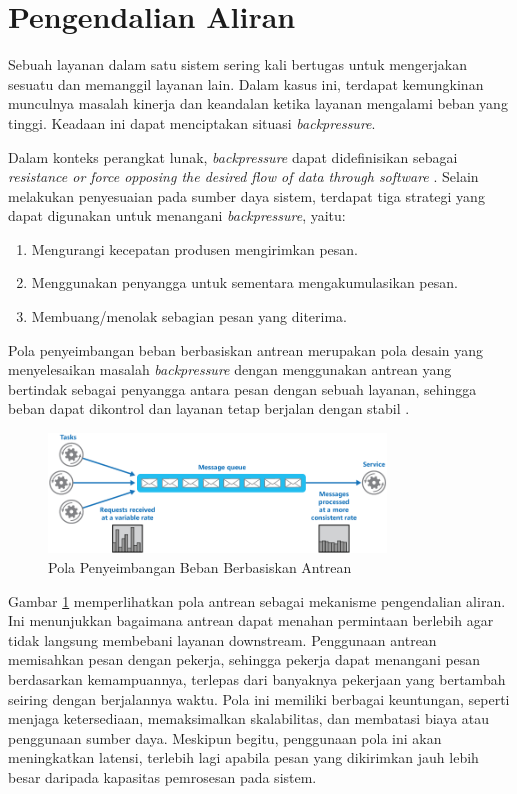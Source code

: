 \section{Pengendalian Aliran}

Sebuah layanan dalam satu sistem sering kali bertugas untuk mengerjakan sesuatu dan memanggil layanan lain. Dalam kasus ini, terdapat kemungkinan munculnya masalah kinerja dan keandalan ketika layanan mengalami beban yang tinggi. Keadaan ini dapat menciptakan situasi \textit{backpressure}.

Dalam konteks perangkat lunak, \textit{backpressure} dapat didefinisikan sebagai \textit{resistance or force opposing the desired flow of data through software} \parencite{backpressureExplained}. Selain melakukan penyesuaian pada sumber daya sistem, terdapat tiga strategi yang dapat digunakan untuk menangani \textit{backpressure}, yaitu:

\begin{enumerate}
    \item Mengurangi kecepatan produsen mengirimkan pesan.
    \item Menggunakan penyangga untuk sementara mengakumulasikan pesan.
    \item Membuang/menolak sebagian pesan yang diterima.
\end{enumerate}

Pola penyeimbangan beban berbasiskan antrean merupakan pola desain yang menyelesaikan masalah \textit{backpressure} dengan menggunakan antrean yang bertindak sebagai penyangga antara pesan dengan sebuah layanan, sehingga beban dapat dikontrol dan layanan tetap berjalan dengan stabil \parencite{queueLoadLeveling}.

\begin{figure}[H]
    \centering
    \includegraphics[width=0.8\textwidth]{resources/chapter-2/queue-based-load-leveling-pattern.png}
    \caption{Pola Penyeimbangan Beban Berbasiskan Antrean \parencite{queueLoadLeveling}}
    \label{fig:queue-based-load-leveling-pattern}
\end{figure}

Gambar \ref{fig:queue-based-load-leveling-pattern} memperlihatkan pola antrean sebagai mekanisme pengendalian aliran. Ini menunjukkan bagaimana antrean dapat menahan permintaan berlebih agar tidak langsung membebani layanan downstream. Penggunaan antrean memisahkan pesan dengan pekerja, sehingga pekerja dapat menangani pesan berdasarkan kemampuannya, terlepas dari banyaknya pekerjaan yang bertambah seiring dengan berjalannya waktu. Pola ini memiliki berbagai keuntungan, seperti menjaga ketersediaan, memaksimalkan skalabilitas, dan membatasi biaya atau penggunaan sumber daya. Meskipun begitu, penggunaan pola ini akan meningkatkan latensi, terlebih lagi apabila pesan yang dikirimkan jauh lebih besar daripada kapasitas pemrosesan pada sistem.